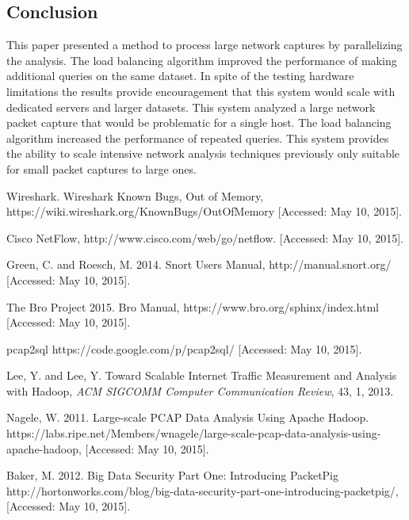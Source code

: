 \documentclass{article}
\begin{document}
\begin{multicols}{2}
\section*{Conclusion}
This paper presented a method to process large network captures by parallelizing the analysis.  The load balancing algorithm improved the performance of making additional queries on the same dataset. In spite of the testing hardware limitations the results provide encouragement that this system would scale with dedicated servers and larger datasets. This system analyzed a large network packet capture that would be problematic for a single host. The load balancing algorithm increased the performance of repeated queries.  This system provides the ability to scale intensive network analysis techniques previously only suitable for small packet captures to large ones.



\end{multicols}


\begin{thebibliography}{9}

  Wireshark.
  Wireshark Known Bugs, Out of Memory,
  https://wiki.wireshark.org/KnownBugs/OutOfMemory
  [Accessed: May 10, 2015].

  Cisco NetFlow,
  http://www.cisco.com/web/go/netflow.
  [Accessed: May 10, 2015].
  
  Green, C. and Roesch, M.
  2014.
  Snort Users Manual,
  http://manual.snort.org/
  [Accessed: May 10, 2015].

  The Bro Project
  2015.
  Bro Manual,
  https://www.bro.org/sphinx/index.html
  [Accessed: May 10, 2015].

  pcap2sql
  https://code.google.com/p/pcap2sql/
  [Accessed: May 10, 2015].
  
  Lee, Y. and Lee, Y.
  Toward Scalable Internet Traffic Measurement and Analysis with Hadoop,
  \emph{ACM SIGCOMM Computer Communication Review},
  43, 1, 2013.

  Nagele, W.
  2011.
  Large-scale PCAP Data Analysis Using Apache Hadoop. 
  https://labs.ripe.net/Members/wnagele/large-scale-pcap-data-analysis-using-apache-hadoop,
  [Accessed: May 10, 2015].
  
  Baker, M.
  2012.
  Big Data Security Part One: Introducing PacketPig
  http://hortonworks.com/blog/big-data-security-part-one-introducing-packetpig/,
  [Accessed: May 10, 2015].
  
\end{thebibliography}
\end{document}
